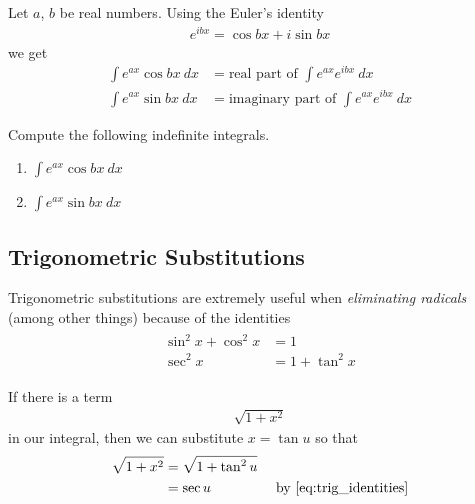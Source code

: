 Let $a$, $b$ be real numbers.
Using the Euler's identity
\begin{align*}
	e^{ibx} = \cos bx + i \sin bx
\end{align*}
we get
\begin{align*}
	\int e^{ax} \cos bx \: dx & = \mbox{real part of } \int e^{ax} e^{ibx} \: dx      \\
	\int e^{ax} \sin bx \: dx & = \mbox{imaginary part of } \int e^{ax} e^{ibx} \: dx\end{align*}
\begin{exercise}
	Compute the following indefinite integrals.
	\begin{multicols}{2}
		\begin{enumerate}
			\item $\int e^{ax} \cos bx \: dx$
			\item $\int e^{ax} \sin bx \: dx $
		\end{enumerate}
	\end{multicols}
\end{exercise}




\subsection{Trigonometric Substitutions}

Trigonometric substitutions are extremely useful when {\it eliminating radicals} (among other things) because of the identities
\begin{align}
	\begin{split}
		\label{eq:trig_identities}
		\sin^2 x + \cos^2 x &= 1 \\
		\sec^2 x &= 1 + \tan^2 x
	\end{split}
\end{align}

\begin{example}
	If there is a term
	\begin{align*}
		\sqrt{1 + x^2}
	\end{align*}
	in our integral, then we can substitute $ x = \tan u$ so that
	\begin{align*}
		\sqrt{1 + x^2}
		 & = \sqrt{1 + \tan^2 u}                                         \\
		 & = \sec u              & \mbox{ by \eqref{eq:trig_identities}}
	\end{align*}
\end{example}

